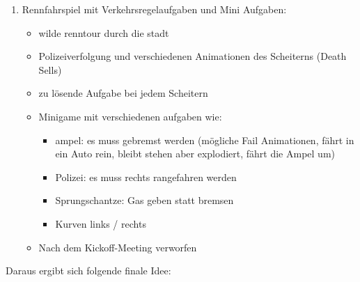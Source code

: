 \begin{enumerate}
		\item{Rennfahrspiel mit Verkehrsregelaufgaben und Mini Aufgaben:}
		\begin{itemize}
			\item{wilde renntour durch die stadt}
			\item{Polizeiverfolgung und verschiedenen Animationen des Scheiterns (Death Sells)}
			\item{zu lösende Aufgabe bei jedem Scheitern}
			\item{Minigame mit verschiedenen aufgaben wie:}
			\begin{itemize}
				\item{ampel: es muss gebremst werden (mögliche Fail Animationen, fährt in ein Auto rein, bleibt stehen aber explodiert, fährt die Ampel um)}
				\item{Polizei: es muss rechts rangefahren werden}
				\item{Sprungschantze: Gas geben statt bremsen}
				\item{Kurven links / rechts}
			\end{itemize}
			\item{Nach dem Kickoff-Meeting verworfen}
		\end{itemize}
	\end{enumerate}
	Daraus ergibt sich folgende finale Idee:
